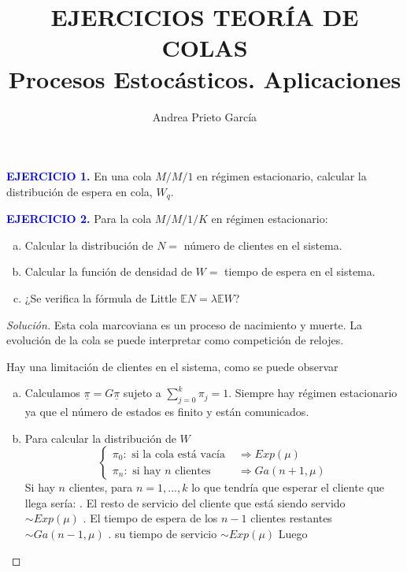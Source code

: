 \documentclass[]{article}
\title{EJERCICIOS TEORÍA DE COLAS \\ Procesos Estocásticos. Aplicaciones }
\author{Andrea Prieto García}
\date{}
\theoremstyle{plain}
\newenvironment{solucion}{\begin{proof}[Soluci\'on]}{\end{proof}}
\begin{document}
\maketitle

\textcolor{blue}{\textbf{EJERCICIO 1.}} En una cola $M/M/1$ en régimen estacionario, calcular la distribución de espera en cola, $W_{q}$.


\medskip
\textcolor{blue}{\textbf{EJERCICIO 2.}} Para la cola $M/M/1/K$ en régimen estacionario: 
\begin{enumerate}[(a)]
	\item Calcular la distribución de $N=$ número de clientes en el sistema.
	\item Calcular la función de densidad de $W=$ tiempo de espera en el sistema.
	\item ¿Se verifica la fórmula de Little $\mathbb{E}N= \lambda \mathbb{E}W$?
\end{enumerate}


\begin{solucion}
	Esta cola marcoviana es un proceso de nacimiento y muerte. La evolución de la cola se puede interpretar como competición de relojes.
	
	Hay una limitación de clientes en el sistema, como se puede observar
	\begin{enumerate}[(a)]
		\item Calculamos $\underline{\pi} = G \underline{\pi}$ sujeto a $\displaystyle \sum_{j=0}^{k} \pi_{j} =1$. Siempre hay régimen estacionario ya que el número de estados es finito y están comunicados. 
		
		\item Para calcular la distribución de $W$
		$$\begin{cases}
		\pi_{0} : \mbox{ si la cola está vacía } & \Rightarrow Exp(\mu) \\
		\pi_{n}: \mbox{ si hay }n \mbox{ clientes } & \Rightarrow Ga(n+1, \mu)
		\end{cases}$$
		Si hay $n$ clientes, para $n=1,...,k$ lo que tendría que esperar el cliente que llega sería: . El resto de servicio del cliente que está siendo servido $\sim Exp(\mu)$ . El tiempo de espera de los $n-1$ clientes restantes $\sim Ga(n-1, \mu)$
		 . su tiempo de servicio $\sim Exp(\mu)$ \newline 
		Luego 
	\end{enumerate}
	
	
\end{solucion}
\end{document}
